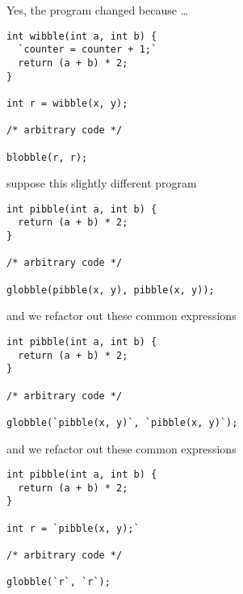 \begin{frame}[fragile]
\begin{block}{Yes, the program changed because \ldots}
\begin{lstlisting}[style=java]
int wibble(int a, int b) {
  `counter = counter + 1;`
  return (a + b) * 2;
}

int r = wibble(x, y);

/* arbitrary code */

blobble(r, r);
\end{lstlisting}
\end{block}
\end{frame}

\begin{frame}[fragile]
\begin{block}{suppose this slightly different program}
\begin{lstlisting}[style=java]
int pibble(int a, int b) {
  return (a + b) * 2;
}

/* arbitrary code */

globble(pibble(x, y), pibble(x, y));
\end{lstlisting}
\end{block}
\end{frame}

\begin{frame}[fragile]
\begin{block}{and we refactor out these common expressions}
\begin{lstlisting}[style=java]
int pibble(int a, int b) {
  return (a + b) * 2;
}

/* arbitrary code */

globble(`pibble(x, y)`, `pibble(x, y)`);
\end{lstlisting}
\end{block}
\end{frame}

\begin{frame}[fragile]
\begin{block}{and we refactor out these common expressions}
\begin{lstlisting}[style=java]
int pibble(int a, int b) {
  return (a + b) * 2;
}

int r = `pibble(x, y);`

/* arbitrary code */

globble(`r`, `r`);
\end{lstlisting}
\end{block}
\end{frame}

